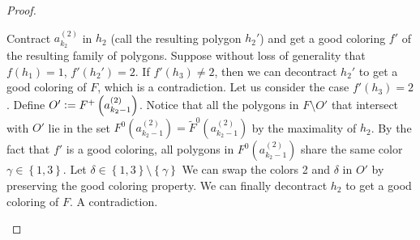 \documentclass[12pt]{article}
\theoremstyle{definition}
\newcommand{\defeq}{\vcentcolon=}
\def\rxhalf{0.5/2}
\def\ryhalf{0.4/2}
\def\rxonepoint{1.5/2}
\def\ryonepoint{0.9/2}
\def\rxstwopoint{(3 - 1.5/2)/2}
\def\rxtwopoint{2.5/2}
\def\rytwopoint{1.5/2}
\def\rxfivepoint{5.5/2}
\def\ryfivepoint{3.0/2}
\begin{document}
\begin{proof}
\begin{itemize}
\begin{figure}[ht]
\begin{center}
{
             }
             \end{center}
             \caption{}
             \label{figure:t=3}
             \end{figure}

             Contract $a_{k_2}^{\left(2\right)}$ 
             in $h_2$ (call the resulting
             polygon $h_2'$)
             and get a good coloring
             $f'$ of the resulting family
             of polygons.
             Suppose without loss of
             generality that $f\left(h_1\right) = 1$,
             $f'\left(h_2'\right) = 2$.
             If $f'\left(h_3\right) \neq 2$, 
             then we can decontract $h_2'$ 
             to get a good coloring of $F$, 
             which is a contradiction.
             Let us consider the case
             $f'\left(h_3\right) = 2$.
             Define $O' \defeq F^{+}\left(a_{k_2 - 1}^{\left(2\right)}\right)$.
             Notice that all the polygons in
             $F \setminus O'$ that intersect with
             $O'$ lie in the set 
             $F^{0}\left(a_{k_2-1}^{\left(2\right)}\right) =
             \widetilde{F}^{0}\left(a_{k_2-1}^{\left(2\right)}\right)$
             by the maximality of $h_2$.
             By the fact that $f'$ is a
             good coloring, all polygons in $F^{0}\left(
             a_{k_2-1}^{\left(2\right)}\right)$
             share the same color $\gamma \in \left\{1, 3\right\}$.
             Let $\delta \in \left\{1, 3\right\} 
             \setminus \left\{\gamma\right\}$
             We can swap the colors 2 and $\delta$
             in $O'$ by preserving the good coloring 
             property.
             We can finally decontract $h_2$ to get
             a good coloring of $F$. 
             A contradiction.


\end{itemize}
\end{proof}
\end{document}
